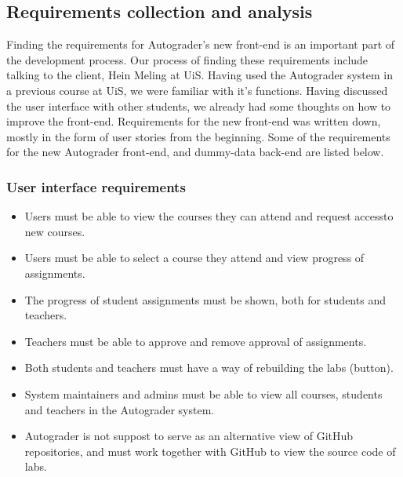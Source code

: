 \subsection{Requirements collection and analysis}
Finding the requirements for Autograder's new front-end is an important part of the development process. Our process of finding these requirements include talking to the client, Hein Meling at UiS. Having used the Autograder system in a previous course at UiS, we were familiar with it's functions. 
Having discussed the user interface with other students, we already had some thoughts on how to improve the front-end. Requirements for the new front-end was written down, mostly in the form of user stories from the beginning. Some of the requirements for the new Autograder front-end, and dummy-data back-end are listed below.

\subsubsection{User interface requirements}
\begin{itemize}
\item Users must be able to view the courses they can attend and request accessto new courses.
\item Users must be able to select a course they attend and view progress of assignments.
\item The progress of student assignments must be shown, both for students and teachers.
\item Teachers must be able to approve and remove approval of assignments.
\item Both students and teachers must have a way of rebuilding the labs (button).
\item System maintainers and admins must be able to view all courses, students and teachers in the Autograder system.
\item Autograder is not suppost to serve as an alternative view of GitHub repositories, and must work together with GitHub to view the source code of labs.
\end{itemize}

